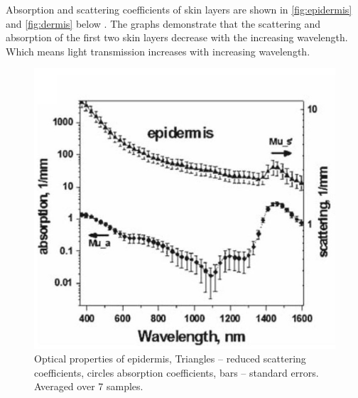 Absorption and scattering coefficients of skin layers are shown in \autoref{fig:epidermis} and \autoref{fig:dermis} below \parencite{skin1}. The graphs demonstrate that the scattering and absorption of the first two skin layers decrease with the increasing wavelength. Which means light transmission increases with increasing wavelength.


\begin{figure}[H]
\centering
\includegraphics[scale=0.5]{figures/epidermis.JPG}
\captionsetup{justification=centering}
\caption[Optical properties of epidermis]{Optical properties of epidermis, Triangles – reduced scattering coefficients, circles absorption coefficients, bars – standard errors. Averaged over 7 samples.}\label{fig:epidermis}
\end{figure}






